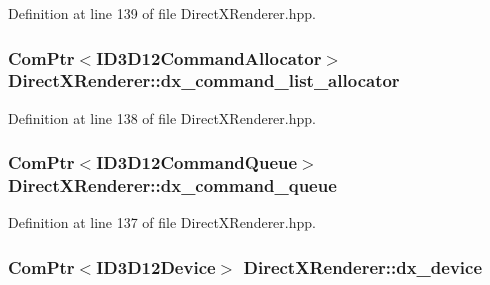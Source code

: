 Definition at line 139 of file Direct\+X\+Renderer.\+hpp.

\subsubsection[{\texorpdfstring{dx\+\_\+command\+\_\+list\+\_\+allocator}{dx_command_list_allocator}}]{\setlength{\rightskip}{0pt plus 5cm}Com\+Ptr$<$I\+D3\+D12\+Command\+Allocator$>$ Direct\+X\+Renderer\+::dx\+\_\+command\+\_\+list\+\_\+allocator\hspace{0.3cm}{\ttfamily [protected]}}\hypertarget{class_direct_x_renderer_a885e10b057d3e1d3f2c76045e567887e_a885e10b057d3e1d3f2c76045e567887e}{}\label{class_direct_x_renderer_a885e10b057d3e1d3f2c76045e567887e_a885e10b057d3e1d3f2c76045e567887e}


Definition at line 138 of file Direct\+X\+Renderer.\+hpp.

\subsubsection[{\texorpdfstring{dx\+\_\+command\+\_\+queue}{dx_command_queue}}]{\setlength{\rightskip}{0pt plus 5cm}Com\+Ptr$<$I\+D3\+D12\+Command\+Queue$>$ Direct\+X\+Renderer\+::dx\+\_\+command\+\_\+queue\hspace{0.3cm}{\ttfamily [protected]}}\hypertarget{class_direct_x_renderer_a8b99048329168c87d7ef207698caeddc_a8b99048329168c87d7ef207698caeddc}{}\label{class_direct_x_renderer_a8b99048329168c87d7ef207698caeddc_a8b99048329168c87d7ef207698caeddc}


Definition at line 137 of file Direct\+X\+Renderer.\+hpp.

\subsubsection[{\texorpdfstring{dx\+\_\+device}{dx_device}}]{\setlength{\rightskip}{0pt plus 5cm}Com\+Ptr$<$I\+D3\+D12\+Device$>$ Direct\+X\+Renderer\+::dx\+\_\+device\hspace{0.3cm}{\ttfamily [protected]}}\hypertarget{class_direct_x_renderer_a665ce2d16dd1e15e4e3f7ecef3c5b11a_a665ce2d16dd1e15e4e3f7ecef3c5b11a}{}\label{class_direct_x_renderer_a665ce2d16dd1e15e4e3f7ecef3c5b11a_a665ce2d16dd1e15e4e3f7ecef3c5b11a}


